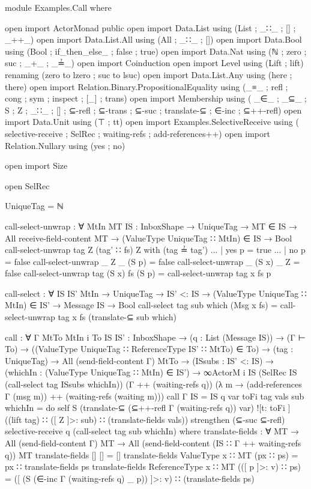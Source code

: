 \begin{code}
module Examples.Call where

open import ActorMonad public
open import Data.List using (List ; _∷_ ; [] ; _++_)
open import Data.List.All using (All ; _∷_ ; [])
open import Data.Bool using (Bool ; if_then_else_ ; false ; true)
open import Data.Nat using (ℕ ; zero ; suc ; _+_ ; _≟_)
open import Coinduction
open import Level using (Lift ; lift) renaming (zero to lzero ; suc to lsuc)
open import Data.List.Any using (here ; there)
open import Relation.Binary.PropositionalEquality
            using (_≡_ ; refl ; cong ; sym ; inspect ; [_] ; trans)
open import Membership using (
            _∈_ ; _⊆_ ; S ; Z ; _∷_ ; [] ; ⊆-refl
            ; ⊆-trans ; ⊆-suc ; translate-⊆
            ; ∈-inc ; ⊆++-refl)
open import Data.Unit using (⊤ ; tt)
open import Examples.SelectiveReceive using (
            selective-receive ; SelRec ; waiting-refs
            ; add-references++)
open import Relation.Nullary using (yes ; no)

open import Size

open SelRec

UniqueTag = ℕ

call-select-unwrap : ∀ {MtIn MT} {IS : InboxShape} →
                     UniqueTag →
                     MT ∈ IS →
                     All receive-field-content MT →
                     (ValueType UniqueTag ∷ MtIn) ∈ IS →
                     Bool
call-select-unwrap tag Z (tag' ∷ fs) Z with (tag ≟ tag')
... | yes p = true
... | no p = false
call-select-unwrap _ Z _ (S p) = false
call-select-unwrap _ (S x) _ Z = false
call-select-unwrap tag (S x) fs (S p) = call-select-unwrap tag x fs p

call-select : ∀ {IS IS' MtIn} →
              UniqueTag →
              IS' <: IS →
              (ValueType UniqueTag ∷ MtIn) ∈ IS' →
              Message IS →
              Bool
call-select tag sub which (Msg x fs) =
  call-select-unwrap tag x fs (translate-⊆  sub which)

call : ∀ {Γ MtTo MtIn i} {To IS IS' : InboxShape} →
       (q : List (Message IS)) →
       (Γ ⊢ To) →
       ((ValueType UniqueTag ∷ ReferenceType IS' ∷ MtTo) ∈ To) →
       (tag : UniqueTag) →
       All (send-field-content Γ) MtTo →
       (ISsubs : IS' <: IS) →
       (whichIn : (ValueType UniqueTag ∷ MtIn) ∈ IS') →
       ∞ActorM i IS
         (SelRec IS (call-select tag ISsubs whichIn))
         (Γ ++ (waiting-refs q))
         (λ m → (add-references Γ (msg m)) ++ (waiting-refs (waiting m)))
call {Γ} {IS = IS} q var toFi tag vals sub whichIn = do
     self
     S (translate-⊆ (⊆++-refl Γ (waiting-refs q)) var)
       ![t: toFi ]
       ((lift tag) ∷ ([ Z ]>: sub) ∷ (translate-fields vals))
     strengthen (⊆-suc ⊆-refl)
     selective-receive q (call-select tag sub whichIn)
  where
    translate-fields : ∀ {MT} → All (send-field-content  Γ) MT →
                         All (send-field-content (IS ∷ Γ ++ waiting-refs q)) MT
    translate-fields {[]} [] = []
    translate-fields {ValueType x ∷ MT} (px ∷ ps) =
      px ∷ translate-fields ps
    translate-fields {ReferenceType x ∷ MT} (([ p ]>: v) ∷ ps) =
      ([ (S (∈-inc Γ (waiting-refs q) _ p)) ]>: v) ∷ (translate-fields ps)


\end{code}
